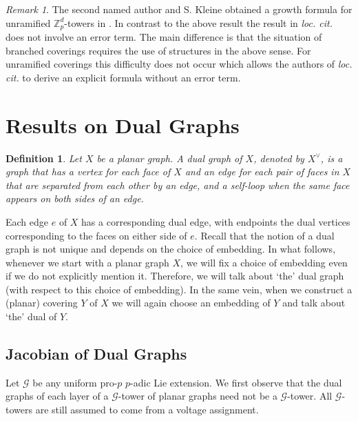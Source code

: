 \documentclass{amsart}
\newtheorem{definition}[theorem]{Definition}
\numberwithin{equation}{section}
\theoremstyle{remark}
\newtheorem{remark}[theorem]{Remark}
\newcommand{\Z}{\mathbb{Z}}
\newcommand{\cG}{\mathcal{G}}
\theoremstyle{plain} %
\begin{document}
\begin{remark}
{The second named author and S. Kleine obtained a growth formula for unramified $\Z_p^d$-towers in \cite{Kleine-Mueller4}.
In contrast to the above result the result in \emph{loc. cit.} does not involve an error term.
The main difference is that the situation of branched coverings requires the use of structures in the above sense.
For unramified coverings this difficulty does not occur which allows the authors of \emph{loc. cit.} to derive an explicit formula without an error term. }
\end{remark}

\section{Results on Dual Graphs}
\label{sec: results on dual graphs}

\begin{definition}
Let $X$ be a planar graph.
{A} \emph{dual graph} of $X$, denoted by $X^\vee$, is a graph that has a vertex for each face of $X$ and an edge for each pair of faces in $X$ that are separated from each other by an edge, and a self-loop when the same face appears on both sides of an edge.
\end{definition}

Each edge $e$ of $X$ has a corresponding dual edge, with endpoints the dual vertices corresponding to the faces on either side of $e$.
{Recall that the notion of a dual graph is not unique and depends on the choice of embedding.
In what follows, whenever we start with a planar graph $X$, we will fix a choice of embedding even if we do not explicitly mention it.
Therefore, we will talk about `the' dual graph (with respect to this choice of embedding).
In the same vein, when we construct a (planar) covering $Y$ of $X$ we will again choose an embedding of $Y$ and talk about `the' dual of $Y$.}

\subsection{Jacobian of Dual Graphs}
Let $\cG$ be any uniform pro-$p$ $p$-adic Lie extension.
We first observe that the dual graphs of each layer of a $\cG$-tower of planar graphs need not be a $\cG$-tower.
{All $\mathcal{G}$-towers are still assumed to come from a voltage assignment.}
\end{document}
